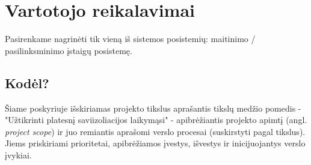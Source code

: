 \documentclass{VUMIFPSkursinis}
\begin{document}
\section{Vartotojo reikalavimai}\label{sec:vartotojoReq}

Pasirenkame nagrinėti tik vieną iš sistemos posistemių: maitinimo / pasilinksminimo įstaigų posistemę.

\subsection{Kodėl?}\label{sec:vartotojoReqWhy}

Šiame poskyriuje išskiriamas projekto tikslus aprašantis tikslų medžio pomedis - "Užtikrinti platesnį saviizoliacijos laikymąsi" - apibrėžiantis projekto apimtį (angl. \emph{project scope}) ir 
juo remiantis aprašomi verslo procesai (suskirstyti pagal tikslus). Jiems priskiriami prioritetai, apibrėžiamos įvestys, išvestys ir inicijuojantys verslo įvykiai.
\end{document}
